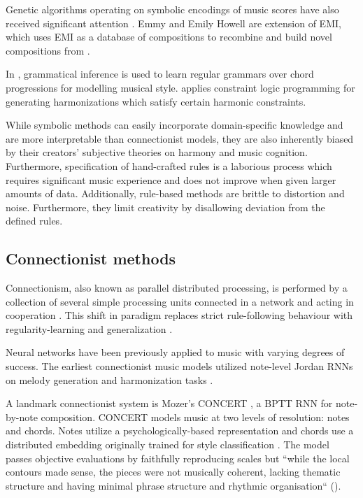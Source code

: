 
Genetic algorithms operating on symbolic encodings of music scores have also
received significant attention \citet{weinberg2007real,cope2010recombinant}.
Emmy and Emily Howell \citep{cope2013well} are extension of EMI, which
uses EMI as a database of compositions to recombine and build novel
compositions from \cite{cope2010recombinant}.

In \citet{cruz1998learning}, grammatical inference is used to learn regular
grammars over chord progressions for modelling musical style.
\citet{tsang1991harmonizing} applies constraint logic programming for
generating harmonizations which satisfy certain harmonic constraints.

While symbolic methods can easily incorporate domain-specific knowledge and are
more interpretable than connectionist models, they are also inherently biased
by their creators' subjective theories on harmony and music cognition.
Furthermore, specification of hand-crafted rules is a laborious process which
requires significant music experience and does not improve when given larger
amounts of data. Additionally, rule-based methods are brittle to distortion and
noise. Furthermore, they limit creativity by disallowing deviation from the
defined rules.

\subsection{Connectionist methods}

Connectionism, also known as parallel distributed processing, is performed by a
collection of several simple processing units connected in a network and acting
in cooperation \citep{pdp1986parallel}. This shift in paradigm replaces strict
rule-following behaviour with regularity-learning and generalization
\citep{dolson1989machine}.

Neural networks have been previously applied to music with varying degrees of
success\citep{griffith1999musical}. The earliest connectionist music models
utilized note-level Jordan RNNs on melody generation and harmonization tasks
\citep{todd1988sequential,todd1989connectionist,bharucha1989modeling}.

A landmark connectionist system is Mozer's CONCERT \citep{mozer1994neural}, a
BPTT RNN for note-by-note composition. CONCERT models music at two
levels of resolution: notes and chords. Notes utilize a psychologically-based
representation \citep{shepard1982geometrical} and chords use a distributed
embedding originally trained for style classification
\citep{laden1989representation}. The model passes objective evaluations by
faithfully reproducing scales but ``while the local contours made sense, the
pieces were not musically coherent, lacking thematic structure and having
minimal phrase structure and rhythmic organisation`` (\citet{mozer1994neural}).

